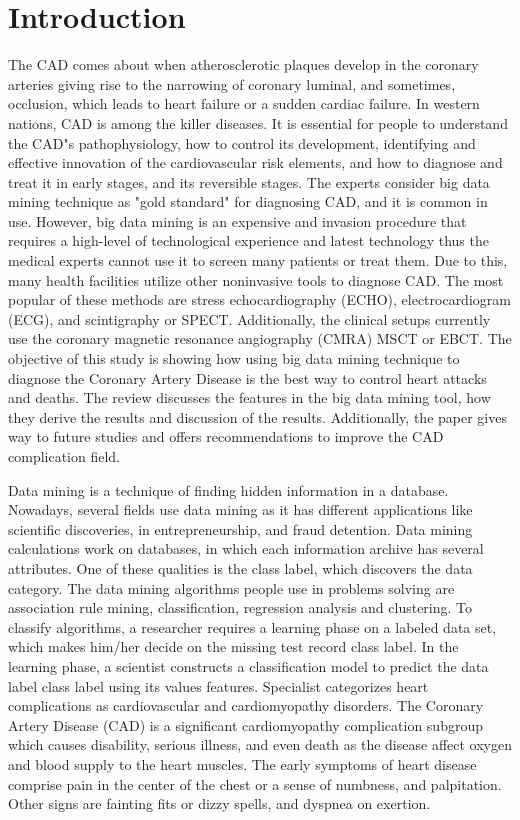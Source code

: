 \documentclass[sigconf]{acmart}
\begin{document}
\section{Introduction}
The CAD comes about when atherosclerotic plaques develop in the coronary arteries giving rise to the narrowing of coronary luminal, and sometimes, occlusion, which leads to heart failure or a sudden cardiac failure. In western nations, CAD is among the killer diseases. It is essential for people to understand the CAD"s pathophysiology, how to control its development, identifying and effective innovation of the cardiovascular risk elements, and how to diagnose and treat it in early stages, and its reversible stages. The experts consider big data mining technique as "gold standard" for diagnosing CAD, and it is common in use. However, big data mining is an expensive and invasion procedure that requires a high-level of technological experience and latest technology thus the medical experts cannot use it to screen many patients or treat them.  Due to this, many health facilities utilize other noninvasive tools to diagnose CAD. The most popular of these methods are stress echocardiography (ECHO), electrocardiogram (ECG), and scintigraphy or SPECT. Additionally, the clinical setups currently use the coronary magnetic resonance angiography (CMRA) MSCT or EBCT. The objective of this study is showing how using big data mining technique to diagnose the Coronary Artery Disease is the best way to control heart attacks and deaths. The review discusses the features in the big data mining tool, how they derive the results and discussion of the results. Additionally, the paper gives way to future studies and offers recommendations to improve the CAD complication field. 
\par Data mining is a technique of finding hidden information in a database. Nowadays, several fields use data mining as it has different applications like scientific discoveries, in entrepreneurship, and fraud detention. Data mining calculations work on databases, in which each information archive has several attributes.  One of these qualities is the class label, which discovers the data category. The data mining algorithms people use in problems solving are association rule mining, classification, regression analysis and clustering.
To classify algorithms, a researcher requires a learning phase on a labeled data set, which makes him/her decide on the missing test record class label. In the learning phase, a scientist constructs a classification model to predict the data label class label using its values features. Specialist categorizes heart complications as cardiovascular and cardiomyopathy disorders. The Coronary Artery Disease (CAD) is a significant cardiomyopathy complication subgroup which causes disability, serious illness, and even death as the disease affect oxygen and blood supply to the heart muscles. The early symptoms of heart disease comprise pain in the center of the chest or a sense of numbness, and palpitation. Other signs are fainting fits or dizzy spells, and dyspnea on exertion. 
\end{document}
